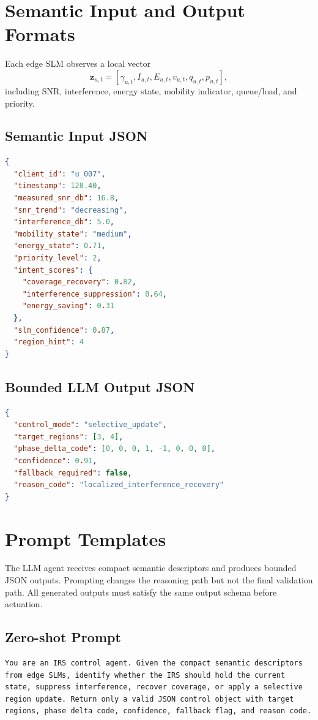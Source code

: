 \documentclass[11pt]{article}
\begin{document}
\section{Semantic Input and Output Formats}

Each edge SLM observes a local vector
\begin{equation}
\mathbf{z}_{u,t}=[\gamma_{u,t},I_{u,t},E_{u,t},v_{u,t},q_{u,t},p_{u,t}],
\end{equation}
including SNR, interference, energy state, mobility indicator, queue/load, and priority.

\subsection{Semantic Input JSON}
\begin{lstlisting}[language=json]
{
  "client_id": "u_007",
  "timestamp": 128.40,
  "measured_snr_db": 16.8,
  "snr_trend": "decreasing",
  "interference_db": 5.0,
  "mobility_state": "medium",
  "energy_state": 0.71,
  "priority_level": 2,
  "intent_scores": {
    "coverage_recovery": 0.82,
    "interference_suppression": 0.64,
    "energy_saving": 0.31
  },
  "slm_confidence": 0.87,
  "region_hint": 4
}
\end{lstlisting}

\subsection{Bounded LLM Output JSON}
\begin{lstlisting}[language=json]
{
  "control_mode": "selective_update",
  "target_regions": [3, 4],
  "phase_delta_code": [0, 0, 0, 1, -1, 0, 0, 0],
  "confidence": 0.91,
  "fallback_required": false,
  "reason_code": "localized_interference_recovery"
}
\end{lstlisting}

\section{Prompt Templates}

The LLM agent receives compact semantic descriptors and produces bounded JSON outputs. Prompting changes the reasoning path but not the final validation path. All generated outputs must satisfy the same output schema before actuation.

\subsection{Zero-shot Prompt}
\begin{lstlisting}
You are an IRS control agent. Given the compact semantic descriptors from edge SLMs, identify whether the IRS should hold the current state, suppress interference, recover coverage, or apply a selective region update. Return only a valid JSON control object with target regions, phase delta code, confidence, fallback flag, and reason code.
\end{lstlisting}
\end{document}
